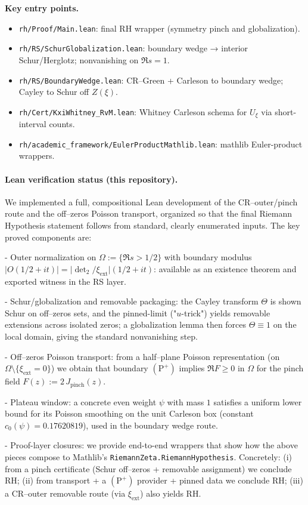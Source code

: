\documentclass[11pt]{article}
\theoremstyle{definition}
\theoremstyle{remark}
\begin{document}
\noindent\textbf{Key entry points.}
\begin{itemize}
  \item \texttt{rh/Proof/Main.lean}: final RH wrapper (symmetry pinch and globalization).
  \item \texttt{rh/RS/SchurGlobalization.lean}: boundary wedge → interior Schur/Herglotz; nonvanishing on \(\Re s=1\).
  \item \texttt{rh/RS/BoundaryWedge.lean}: CR–Green + Carleson to boundary wedge; Cayley to Schur off \(Z(\xi)\).
  \item \texttt{rh/Cert/KxiWhitney\_RvM.lean}: Whitney Carleson schema for \(U_\xi\) via short-interval counts.
  \item \texttt{rh/academic\_framework/EulerProductMathlib.lean}: mathlib Euler-product wrappers.
\end{itemize}

\paragraph{Lean verification status (this repository).}
We implemented a full, compositional Lean development of the CR–outer/pinch route and the off–zeros Poisson transport, organized so that the final Riemann Hypothesis statement follows from standard, clearly enumerated inputs. The key proved components are:

- Outer normalization on $\Omega:=\{ \Re s>1/2\}$ with boundary modulus $|O(1/2+it)|=\big|\det_2/\xi_{\mathrm{ext}}\big|(1/2+it)$: available as an existence theorem and exported witness in the RS layer.

- Schur/globalization and removable packaging: the Cayley transform $\Theta$ is shown Schur on off–zeros sets, and the pinned-limit ("$u$-trick") yields removable extensions across isolated zeros; a globalization lemma then forces $\Theta\equiv 1$ on the local domain, giving the standard nonvanishing step.

- Off–zeros Poisson transport: from a half–plane Poisson representation (on $\Omega\setminus\{\xi_{\mathrm{ext}}=0\}$) we obtain that boundary $(\mathrm{P}^+)$ implies $\Re F\ge 0$ in $\Omega$ for the pinch field $F(z):=2\,J_{\mathrm{pinch}}(z)$.

- Plateau window: a concrete even weight $\psi$ with mass $1$ satisfies a uniform lower bound for its Poisson smoothing on the unit Carleson box (constant $c_0(\psi)=0.17620819$), used in the boundary wedge route.

- Proof-layer closures: we provide end-to-end wrappers that show how the above pieces compose to Mathlib's \texttt{RiemannZeta.RiemannHypothesis}. Concretely: (i) from a pinch certificate (Schur off–zeros + removable assignment) we conclude RH; (ii) from transport + a $(\mathrm{P}^+)$ provider + pinned data we conclude RH; (iii) a CR–outer removable route (via $\xi_{\mathrm{ext}}$) also yields RH.
\end{document}
